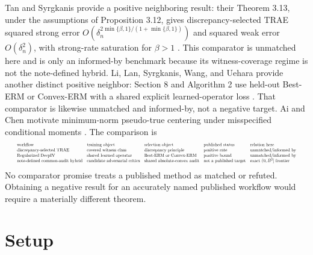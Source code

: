 \documentclass{article}
\begin{document}
Tan and Syrgkanis provide a positive neighboring result: their Theorem 3.13, under the assumptions of Proposition 3.12, gives discrepancy-selected TRAE squared strong error \(O(\delta_n^{2\min\{\beta,1\}/(1+\min\{\beta,1\})})\) and squared weak error \(O(\delta_n^2)\), with strong-rate saturation for \(\beta>1\) \cite{TanSyrgkanis2026Adaptive}. This comparator is unmatched here and is only an informed-by benchmark because its witness-coverage regime is not the note-defined hybrid. Li, Lan, Syrgkanis, Wang, and Uehara provide another distinct positive neighbor: Section 8 and Algorithm 2 use held-out Best-ERM or Convex-ERM with a shared explicit learned-operator loss \cite{LiLanSyrgkanisWangUehara2024RegularizedDeepIV}. That comparator is likewise unmatched and informed-by, not a negative target. Ai and Chen motivate minimum-norm pseudo-true centering under misspecified conditional moments \cite{AiChen2007MisspecifiedConditionalMoments}. The comparison is
\[
\makebox[\linewidth][c]{\resizebox{0.98\linewidth}{!}{\(\displaystyle \begin{array}{lllll}
\text{workflow} & \text{training object} & \text{selection object} & \text{published status} & \text{relation here}\\
\text{discrepancy-selected TRAE} & \text{covered witness class} & \text{discrepancy principle} & \text{positive rate} & \text{unmatched/informed by}\\
\text{Regularized DeepIV} & \text{shared learned operator} & \text{Best-ERM or Convex-ERM} & \text{positive bound} & \text{unmatched/informed by}\\
\text{note-defined common-audit hybrid} & \text{candidate adversarial critics} & \text{shared absolute-convex audit} & \text{not a published target} & \text{exact }(0,B^2]\text{ frontier}
\end{array}\)}}
\]
No comparator promise treats a published method as matched or refuted. Obtaining a negative result for an accurately named published workflow would require a materially different theorem.

\section{Setup}
\end{document}
